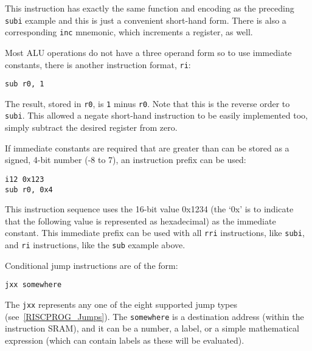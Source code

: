 This instruction has exactly the same function and encoding as the preceding
\texttt{subi} example and this is just a convenient short-hand form. There is
also a corresponding \texttt{inc} mnemonic, which increments a register, as well.

Most ALU operations do not have a three operand form so to use immediate
constants, there is another instruction format, \texttt{ri}:

\begin{center}
\begin{minipage}{0.5\linewidth}
\texttt{sub r0, 1}
\end{minipage}
\end{center}

The result, stored in \texttt{r0}, is \texttt{1} minus \texttt{r0}. Note that
this is the reverse order to \texttt{subi}. This allowed a negate short-hand
instruction to be easily implemented too, simply subtract the desired register
from zero.

If immediate constants are required that are greater than can be stored as a
signed, 4-bit number (-8 to 7), an instruction prefix can be used:

\begin{center}
\begin{minipage}{0.5\linewidth}
\texttt{i12 0x123}	\\
\texttt{sub r0, 0x4}
\end{minipage}
\end{center}

This instruction sequence uses the 16-bit value 0x1234 (the `0x' is to indicate
that the following value is represented as hexadecimal) as the immediate
constant. This immediate prefix can be used with all \texttt{rri} instructions,
like \texttt{subi}, and \texttt{ri} instructions, like the \texttt{sub} example
above.

Conditional jump instructions are of the form:

\begin{center}
\begin{minipage}{0.5\linewidth}
\texttt{jxx	somewhere}
\end{minipage}
\end{center}

The \texttt{jxx} represents any one of the eight supported jump types
(see~\ref{RISCPROG_Jumps}). The \texttt{somewhere} is a destination address
(within the instruction SRAM), and it can be a number, a label, or a simple
mathematical expression (which can contain labels as these will be evaluated).

